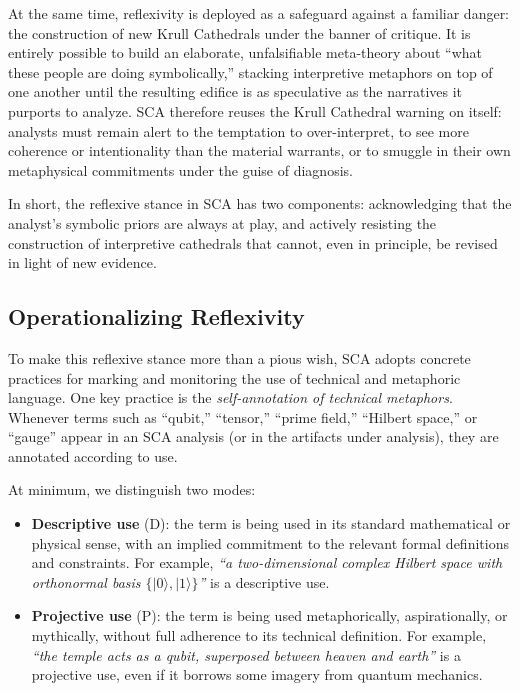 \documentclass[12]{amsart}
\theoremstyle{plain}
\begin{document}
At the same time, reflexivity is deployed as a safeguard against a familiar danger: the construction of new Krull Cathedrals under the banner of critique. It is entirely possible to build an elaborate, unfalsifiable meta-theory about ``what these people are doing symbolically,'' stacking interpretive metaphors on top of one another until the resulting edifice is as speculative as the narratives it purports to analyze. SCA therefore reuses the Krull Cathedral warning on itself: analysts must remain alert to the temptation to over-interpret, to see more coherence or intentionality than the material warrants, or to smuggle in their own metaphysical commitments under the guise of diagnosis.

In short, the reflexive stance in SCA has two components: acknowledging that the analyst's symbolic priors are always at play, and actively resisting the construction of interpretive cathedrals that cannot, even in principle, be revised in light of new evidence.

\subsection{Operationalizing Reflexivity}

To make this reflexive stance more than a pious wish, SCA adopts concrete practices for marking and monitoring the use of technical and metaphoric language. One key practice is the \emph{self-annotation of technical metaphors}. Whenever terms such as ``qubit,'' ``tensor,'' ``prime field,'' ``Hilbert space,'' or ``gauge'' appear in an SCA analysis (or in the artifacts under analysis), they are annotated according to use.

At minimum, we distinguish two modes:

\begin{itemize}
  \item \textbf{Descriptive use} (\textsc{D}): the term is being used in its standard mathematical or physical sense, with an implied commitment to the relevant formal definitions and constraints. For example, \emph{``a two-dimensional complex Hilbert space with orthonormal basis $\{\lvert 0\rangle,\lvert 1\rangle\}$''} is a descriptive use.
  \item \textbf{Projective use} (\textsc{P}): the term is being used metaphorically, aspirationally, or mythically, without full adherence to its technical definition. For example, \emph{``the temple acts as a qubit, superposed between heaven and earth''} is a projective use, even if it borrows some imagery from quantum mechanics.
\end{itemize}
\end{document}
